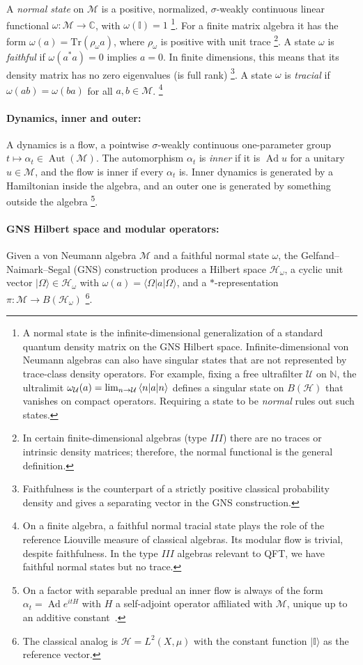 \documentclass[a4paper,11pt]{article}
\theoremstyle{definition}
\newcommand{\id}{\mathbb{I}}
\newcommand{\Tr}{\text{Tr}}
\newcommand{\mM}{\mathcal{M}}
\begin{document}
A \emph{normal state} on $\mM$ is a positive, normalized, $\sigma$-weakly continuous
linear functional $\omega:\mM\to\mathbb{C}$, with $\omega(\id)=1$ \footnote{A normal state is the infinite-dimensional generalization of a standard quantum density matrix on the GNS Hilbert space. Infinite-dimensional von Neumann algebras can also have singular states that are not represented by trace-class density operators. For example, fixing a free ultrafilter $\mathcal U$ on $\mathbb N$, the ultralimit $\omega_{\mathcal U}(a)=\lim_{n\to\mathcal U}\braket{n|a|n}$ defines a singular state on $B(\mathcal H)$ that vanishes on compact operators. Requiring a state to be {\it normal} rules out such states.}.
For a finite matrix algebra it has the form $\omega(a)=\Tr(\rho_\omega a)$,
where $\rho_\omega$ is positive with unit trace \footnote{In certain finite-dimensional algebras (type $III$) there are no traces or intrinsic density matrices; therefore, the normal functional is the general definition.}. A state $\omega$ is \emph{faithful} if $\omega(a^*a)=0$ implies $a=0$.
In finite dimensions, this means that its density matrix has no zero eigenvalues (is full rank) \footnote{Faithfulness is the counterpart of a strictly positive classical probability density
and gives a separating vector in the GNS construction.}. A state $\omega$ is \emph{tracial} if $\omega(ab)=\omega(ba)$ for all $a,b\in\mM$.
\footnote{On a finite algebra, a faithful normal tracial state plays the role of the reference
Liouville measure of classical algebras. Its modular flow is trivial, despite faithfulness. In the type $III$
algebras relevant to QFT, we have faithful normal states but no trace.}

\paragraph{Dynamics, inner and outer:}
A dynamics is a flow, a pointwise $\sigma$-weakly continuous one-parameter group $t\mapsto\alpha_t\in\operatorname{Aut}(\mM)$. The automorphism $\alpha_t$ is \emph{inner} if it is $\operatorname{Ad}u$ for a unitary $u\in\mM$, and the flow is inner if every $\alpha_t$ is. Inner dynamics is generated by a Hamiltonian inside the algebra, and an outer one is generated by something outside the algebra \footnote{On a factor with separable predual an inner flow is always of the form $\alpha_t=\operatorname{Ad}e^{itH}$ with $H$ a self-adjoint operator affiliated with $\mM$, unique up to an additive constant~\cite{Kallman1971}.}. 

\paragraph{GNS Hilbert space and modular operators:}
Given a von Neumann algebra $\mM$ and a faithful normal state $\omega$, the
Gelfand--Naimark--Segal (GNS) construction produces a Hilbert space $\mathcal{H}_\omega$,
a cyclic unit vector $|\Omega\rangle\in\mathcal{H}_\omega$ with
$\omega(a)=\langle\Omega|a|\Omega\rangle$, and a $*$-representation
$\pi:\mM\to B(\mathcal{H}_\omega)$ \footnote{The classical analog is $\mathcal{H}=L^2(X,\mu)$
with the constant function $|\id\rangle$ as the reference vector.}.
\end{document}
